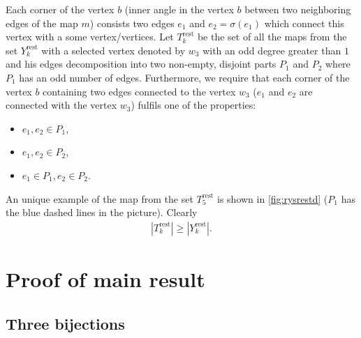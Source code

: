 \documentclass[submission]{FPSAC2021}
\DeclareMathOperator{\rest}{rest}
\newcommand{\nast}
{
	\sigma
}
\begin{document}
Each corner of the vertex $b$ (inner angle in the vertex $b$ between 
two neighboring edges of the map $m$) consists two edges $e_1$ and $e_2=\nast(e_1)$
which connect this vertex with a some vertex/vertices. Let $T_k^{\rest}$
be the set of all the maps from the set $Y_k^{\rest}$ with a selected vertex
denoted by $w_3$ with an odd degree greater than $1$ and his edges decomposition into
two non-empty, disjoint parts $P_1$ and $P_2$ where $P_1$ has an odd
number of edges. Furthermore, we require that each corner 
of the vertex $b$ containing two edges connected to the vertex $w_3$ 
($e_1$ and $e_2$ are connected with the vertex $w_3$)
fulfils one of the properties:
\begin{itemize}
\item $e_1, e_2 \in P_1$,
\item $e_1, e_2 \in P_2$, 
\item $e_1 \in P_1, e_2 \in P_2$. 
\end{itemize}  
An unique example of the map from the set $T_{5}^{\rest}$ is shown in
\cref{fig:rysrestd} ($P_1$ has the blue dashed lines in the picture).
Clearly
\begin{align}
\label{ineqrest}
|T_{k}^{\rest}| \geq |Y_{k}^{\rest}|.
\end{align}

\pagebreak[1] 

\section{Proof of main result}
\subsection{Three bijections}
\end{document}
